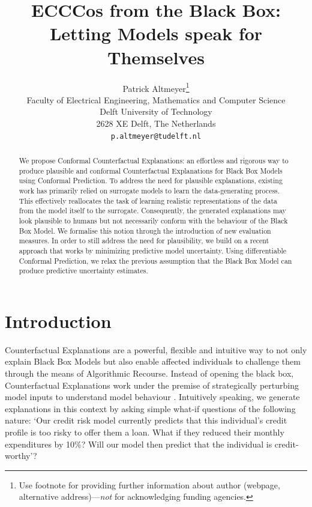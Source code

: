 \documentclass{article}
\title{ECCCos from the Black Box: Letting Models speak for Themselves}
\author{%
  Patrick Altmeyer\thanks{Use footnote for providing further information
    about author (webpage, alternative address)---\emph{not} for acknowledging
    funding agencies.} \\
  Faculty of Electrical Engineering, Mathematics and Computer Science\\
  Delft University of Technology\\
  2628 XE Delft, The Netherlands \\
  \texttt{p.altmeyer@tudelft.nl} \\
}
\begin{document}
\maketitle


\begin{abstract}
  We propose Conformal Counterfactual Explanations: an effortless and rigorous way to produce plausible and conformal Counterfactual Explanations for Black Box Models using Conformal Prediction. To address the need for plausible explanations, existing work has primarily relied on surrogate models to learn the data-generating process. This effectively reallocates the task of learning realistic representations of the data from the model itself to the surrogate. Consequently, the generated explanations may look plausible to humans but not necessarily conform with the behaviour of the Black Box Model. We formalise this notion through the introduction of new evaluation measures. In order to still address the need for plausibility, we build on a recent approach that works by minimizing predictive model uncertainty. Using differentiable Conformal Prediction, we relax the previous assumption that the Black Box Model can produce predictive uncertainty estimates.
\end{abstract}

\section{Introduction}\label{intro}

Counterfactual Explanations are a powerful, flexible and intuitive way to not only explain Black Box Models but also enable affected individuals to challenge them through the means of Algorithmic Recourse. Instead of opening the black box, Counterfactual Explanations work under the premise of strategically perturbing model inputs to understand model behaviour \citep{wachter2017counterfactual}. Intuitively speaking, we generate explanations in this context by asking simple what-if questions of the following nature: `Our credit risk model currently predicts that this individual's credit profile is too risky to offer them a loan. What if they reduced their monthly expenditures by 10\%? Will our model then predict that the individual is credit-worthy'? 
\end{document}
